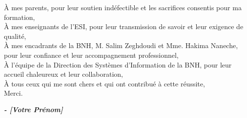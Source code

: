 
\begin{fquote}
    \begin{center}
        \large{

            \uppercase{À} mes parents, pour leur soutien indéfectible et les sacrifices consentis pour ma formation,\\[12pt]

            \uppercase{À} mes enseignants de l'ESI, pour leur transmission de savoir et leur exigence de qualité,\\[12pt]

            \uppercase{À} mes encadrants de la BNH, M. Salim Zeghdoudi et Mme. Hakima Naneche, pour leur confiance et leur accompagnement professionnel,\\[12pt]

            \uppercase{À} l'équipe de la Direction des Systèmes d'Information de la BNH, pour leur accueil chaleureux et leur collaboration,\\[12pt]

            \uppercase{À} tous ceux qui me sont chers et qui ont contribué à cette réussite,\\[12pt]

            Merci.
        }
    \end{center}
    \bigskip
    \medskip
\end{fquote}

\begin{adjustwidth}{2cm}{1cm}
    \hspace*{\fill} \textbf{\textit{\large{- [Votre Prénom]}}}
\end{adjustwidth}

\clearpage